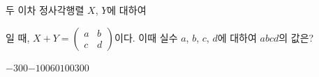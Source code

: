 두 이차 정사각행렬 $X$, $Y$에 대하여 \par\smallskip{}\par\smallskip\noindent 일 때, $X+Y=\begin{pmatrix} a & b \\ c & d \end{pmatrix}$이다. 이때 실수 $a$, $b$, $c$, $d$에 대하여 $abcd$의 값은?
\begin{choices32}{$-300$}{$-100$}{$60$}{$100$}{$300$}\end{choices32}
